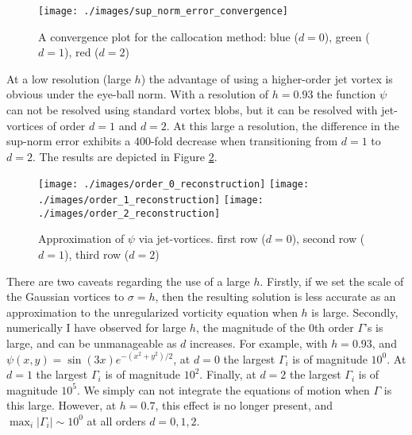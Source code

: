 \documentclass[12pt]{amsart}
\begin{document}
\begin{figure}[h!]
  \centering
  \texttt{[image: ./images/sup\_norm\_error\_convergence]}
  \caption{A convergence plot for the callocation method: blue ($d=0$),
    green ($d=1$), red ($d=2$)}
  \label{fig:convergence}
\end{figure}


At a low resolution (large $h$) the advantage of using a higher-order jet vortex is obvious under the eye-ball norm.
With a resolution of $h = 0.93$ the function $\psi$ can not be resolved using standard vortex blobs, but it can be resolved with jet-vortices of order $d=1$ and $d=2$.
At this large a resolution, the difference in the sup-norm error exhibits a 400-fold
decrease when transitioning from $d=1$ to $d=2$.
The results are depicted in Figure \ref{fig:eye-ball}.


\begin{figure}[h!]
  \centering
  \texttt{[image: ./images/order\_0\_reconstruction]}
  \texttt{[image: ./images/order\_1\_reconstruction]}
  \texttt{[image: ./images/order\_2\_reconstruction]}
  \caption{Approximation of $\psi$ via jet-vortices.  first row ($d=0$),
    second row ($d=1$), third row ($d=2$)}
  \label{fig:eye-ball}
\end{figure}

There are two caveats regarding the use of a large $h$.  Firstly,
if we set the scale of the Gaussian vortices to $\sigma = h$,
then the resulting
solution is less accurate as an approximation to the
unregularized vorticity equation when $h$ is large.
Secondly, numerically I have observed for large $h$, the magnitude
of the $0$th order $\Gamma$'s is large, and can be
unmanageable as $d$ increases.
For example, with $h=0.93$, and $\psi(x,y) = \sin(3x) e^{-(x^2+y^2)/2}$,
at $d=0$ the largest $\Gamma_i$ is of magnitude $10^{0}$.
At $d=1$ the largest $\Gamma_i$ is of magnitude $10^2$.
Finally, at $d=2$ the largest $\Gamma_i$ is of magnitude $10^5$.
We simply can not integrate the equations of motion when $\Gamma$ is this
large.
However, at $h=0.7$, this effect is no longer present, and $\max_i|\Gamma_i| \sim 10^0$ at all orders $d=0,1,2$.



\end{document}
